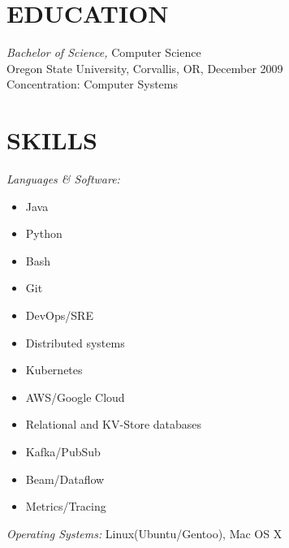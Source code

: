 \documentclass[margin]{res}
\begin{document}
\begin{resume}
\section{EDUCATION} {\sl Bachelor of Science,} Computer Science \\
                Oregon State University, Corvallis, OR,
                December 2009 \\
                Concentration: Computer Systems

\section{ SKILLS} {\sl Languages \& Software:}
            \begin{multicols}{3}
            \begin{itemize}
                \item Java
                \item Python
                \item Bash
                \item Git
                \item DevOps/SRE
                \item Distributed systems
                \item Kubernetes
                \item AWS/Google Cloud
                \item Relational and KV-Store databases
                \item Kafka/PubSub
                \item Beam/Dataflow
                \item Metrics/Tracing
            \end{itemize}
            \end{multicols}

        {\sl Operating Systems:} Linux(Ubuntu/Gentoo), Mac OS X

\end{resume}
\end{document}

